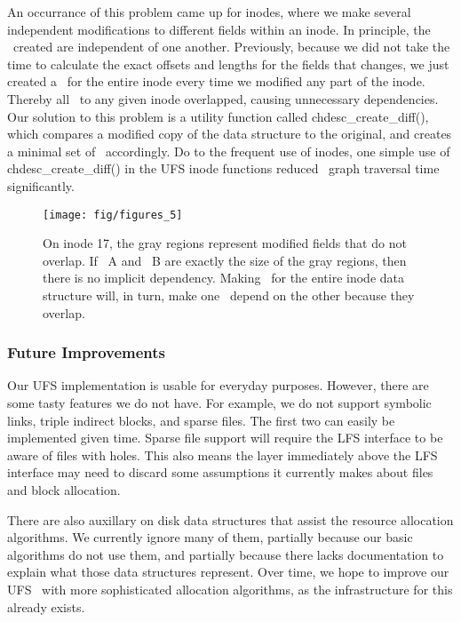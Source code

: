 An occurrance of this problem came up for inodes, where we make several
independent modifications to different fields within an inode. In principle,
the \chdescs\ created are independent of one another. Previously, because we
did not take the time to calculate the exact offsets and lengths for the fields
that changes, we just created a \chdesc\ for the entire inode every time we
modified any part of the inode. Thereby all \chdescs\ to any given inode
overlapped, causing unnecessary dependencies. Our solution to this problem is
a utility function called chdesc\_create\_diff(), which compares a modified
copy of the data structure to the original, and creates a minimal set of
\chdescs\ accordingly. Do to the frequent use of inodes, one simple use of
chdesc\_create\_diff() in the UFS inode functions reduced \chdescs\ graph
traversal time significantly.

\begin{figure}[htb]
  \centering
  \texttt{[image: fig/figures\_5]}
  \caption{\label{fig:overlap} On inode 17, the gray regions represent
  modified fields that do not overlap. If \chdesc\ A and \chdesc\ B are
  exactly the size of the gray regions, then there is no implicit dependency.
  Making \chdescs\ for the entire inode data structure will, in turn, make
  one \chdesc\ depend on the other because they overlap.}
\end{figure}

\subsubsection {Future Improvements}
Our UFS implementation is usable for everyday purposes. However, there are
some tasty features we do not have. For example, we do not support symbolic
links, triple indirect blocks, and sparse files. The first two can easily be
implemented given time. Sparse file support will require the LFS interface
to be aware of files with holes. This also means the layer immediately above
the LFS interface may need to discard some assumptions it currently makes
about files and block allocation.

There are also auxillary on disk data structures that assist the resource
allocation algorithms. We currently ignore many of them, partially because
our basic algorithms do not use them, and partially because there lacks
documentation to explain what those data structures represent. Over time,
we hope to improve our UFS \module\ with more sophisticated allocation
algorithms, as the infrastructure for this already exists.

